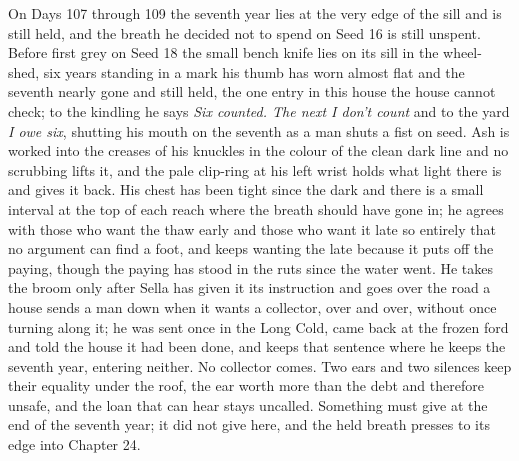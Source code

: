\documentclass{design/chronicle}
\begin{document}
{On Days 107 through 109 the seventh year lies at the very edge of the sill and is still held, and the breath he decided not to spend on Seed 16 is still unspent. Before first grey on Seed 18 the small bench knife lies on its sill in the wheel-shed, six years standing in a mark his thumb has worn almost flat and the seventh nearly gone and still held, the one entry in this house the house cannot check; to the kindling he says \emph{Six counted. The next I don’t count} and to the yard \emph{I owe six}, shutting his mouth on the seventh as a man shuts a fist on seed. Ash is worked into the creases of his knuckles in the colour of the clean dark line and no scrubbing lifts it, and the pale clip-ring at his left wrist holds what light there is and gives it back. His chest has been tight since the dark and there is a small interval at the top of each reach where the breath should have gone in; he agrees with those who want the thaw early and those who want it late so entirely that no argument can find a foot, and keeps wanting the late because it puts off the paying, though the paying has stood in the ruts since the water went. He takes the broom only after Sella has given it its instruction and goes over the road a house sends a man down when it wants a collector, over and over, without once turning along it; he was sent once in the Long Cold, came back at the frozen ford and told the house it had been done, and keeps that sentence where he keeps the seventh year, entering neither. No collector comes. Two ears and two silences keep their equality under the roof, the ear worth more than the debt and therefore unsafe, and the loan that can hear stays uncalled. Something must give at the end of the seventh year; it did not give here, and the held breath presses to its edge into Chapter 24.

}
\end{document}
